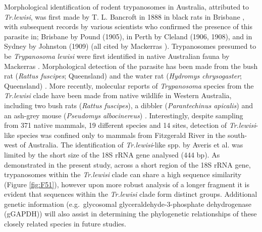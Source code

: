 \documentclass[a4paper, nobind]{templates/ociamthesis}
\begin{document}
Morphological identification of rodent trypanosomes in Australia, attributed to \emph{Tr.lewisi}, was first made by T. L. Bancroft in 1888 in black rats in Brisbane \autocite{mackerrasHaematozoaAustralianMammals1959}, with subsequent records by various scientists who confirmed the presence of this parasite in; Brisbane by Pound (1905), in Perth by Cleland (1906, 1908), and in Sydney by Johnston (1909) (all cited by Mackerras \autocite*{mackerrasHaematozoaAustralianMammals1959}). Trypanosomes presumed to be \emph{Trypanosoma} \emph{lewisi} were first identified in native Australian fauna by Mackerras \autocite*{mackerrasCatalogueAustralianMammals1958a}. Morphological detection of the parasite has been made from the bush rat (\emph{Rattus fuscipes}; Queensland) and the water rat (\emph{Hydromys chrysogaster}; Queensland) \autocite{mackerrasHaematozoaAustralianMammals1959,mackerrasCatalogueAustralianMammals1958a}. More recently, molecular reports of \emph{Trypanosoma} species from the \emph{Tr.lewisi} clade have been made from native wildlife in Western Australia, including two bush rats (\emph{Rattus fuscipes}), a dibbler (\emph{Parantechinus apicalis}) and an ash-grey mouse (\emph{Pseudomys albocinereus}) \autocite{averisDiversityDistributionHostparasite2009}. Interestingly, despite sampling from 371 native mammals, 19 different species and 14 sites, detection of \emph{Tr.lewisi}-like species was confined only to mammals from Fitzgerald River in the south-west of Australia. The identification of \emph{Tr.lewisi}-like spp. by Averis et al. \autocite*{averisDiversityDistributionHostparasite2009} was limited by the short size of the 18S rRNA gene analysed (444 bp). As demonstrated in the present study, across a short region of the 18S rRNA gene, trypanosomes within the \emph{Tr.lewisi} clade can share a high sequence similarity (Figure \ref{fig:F51}), however upon more robust analysis of a longer fragment it is evident that sequences within the \emph{Tr.lewisi} clade form distinct groups. Additional genetic information (e.g.~glycosomal glyceraldehyde-3-phosphate dehydrogenase (gGAPDH)) will also assist in determining the phylogenetic relationships of these closely related species in future studies.
\end{document}

